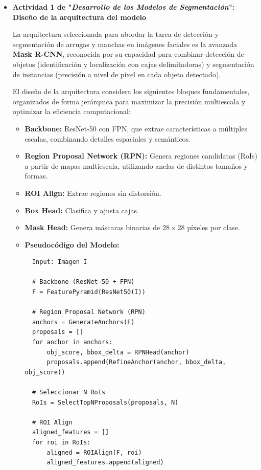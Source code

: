 \begin{enumerate}
\begin{itemize}
 
  \item\textbf{Actividad 1 de "\textit{Desarrollo de los Modelos de Segmentación}": Diseño de la arquitectura del modelo}

La arquitectura seleccionada para abordar la tarea de detección y segmentación de arrugas y manchas en imágenes faciales es la avanzada \textbf{Mask R-CNN}, reconocida por su capacidad para combinar detección de objetos (identificación y localización con cajas delimitadoras) y segmentación de instancias (precisión a nivel de píxel en cada objeto detectado).

El diseño de la arquitectura considera los siguientes bloques fundamentales, organizados de forma jerárquica para maximizar la precisión multiescala y optimizar la eficiencia computacional:

\begin{itemize}
\item \textbf{Backbone:} ResNet-50 con FPN, que extrae características a múltiples escalas, combinando detalles espaciales y semánticos.

\item \textbf{Region Proposal Network (RPN):} Genera regiones candidatas (RoIs) a partir de mapas multiescala, utilizando anclas de distintos tamaños y formas.

\item \textbf{ROI Align:} Extrae regiones sin distorsión.

\item \textbf{Box Head:} Clasifica y ajusta cajas.

\item \textbf{Mask Head:} Genera máscaras binarias de $28 \times 28$ píxeles por clase.

\item \textbf{Pseudocódigo del Modelo:}

\begin{verbatim}
  Input: Imagen I
  
  # Backbone (ResNet-50 + FPN)
  F = FeaturePyramid(ResNet50(I))  
  
  # Region Proposal Network (RPN)
  anchors = GenerateAnchors(F)         
  proposals = []
  for anchor in anchors:
      obj_score, bbox_delta = RPNHead(anchor)  
      proposals.append(RefineAnchor(anchor, bbox_delta, obj_score))
  
  # Seleccionar N RoIs
  RoIs = SelectTopNProposals(proposals, N)
  
  # ROI Align
  aligned_features = []
  for roi in RoIs:
      aligned = ROIAlign(F, roi)
      aligned_features.append(aligned)
  

\end{verbatim}
\end{itemize}
\end{itemize}
\end{enumerate}
